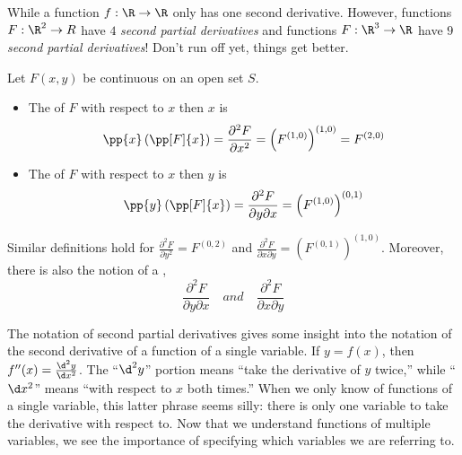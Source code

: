 \documentclass{ximera}
\begin{document}
While a function $f:\R\to\R$ only has one second derivative. However,
functions $F:\R^2\to R$ have $4$ \textit{second partial derivatives}
and functions $F:\R^3\to\R$ have $9$ \textit{second partial
  derivatives}! Don't run off yet, things get better.

\begin{definition}
  Let $F(x,y)$ be continuous on an open set $S$.
  \begin{itemize}
  \item The  of $F$ with respect to $x$ then $x$ is
    \[
    \pp{x}\left(\pp[F]{x}\right) = \frac{\partial^2 F}{\partial x^2} = \left(F^{(1,0)}\right)^{(1,0)}= F^{(2,0)}
    \]
  \item The  of $F$ with respect to
    $x$ then $y$ is
    \[
    \pp{y}\left(\pp[F]{x}\right) = \frac{\partial^2F}{\partial y\partial x} = \left(F^{(1,0)}\right)^{(0,1)}
    \]

%
\end{itemize}
Similar definitions hold for $\frac{\partial^2F}{\partial y^2} =
F^{(0,2)}$ and $\frac{\partial^2F}{\partial x\partial y} =
\left(F^{(0,1)}\right)^{(1,0)}$. Moreover, there is also the notion of
a ,
\[
\frac{\partial^2F}{\partial y\partial x} \quad{and}\quad \frac{\partial^2F}{\partial x\partial y}
\]
\end{definition}

The notation of second partial derivatives gives some insight into the
notation of the second derivative of a function of a single
variable. If $y=f(x)$, then $f''(x) = \frac{\d^2 y}{\d x^2}$. The
``$\d^2y$'' portion means ``take the derivative of $y$ twice,'' while
``$\d x^2$'' means ``with respect to $x$ both times.'' When we only know
of functions of a single variable, this latter phrase seems silly:
there is only one variable to take the derivative with respect to. Now
that we understand functions of multiple variables, we see the
importance of specifying which variables we are referring to.
\end{document}
